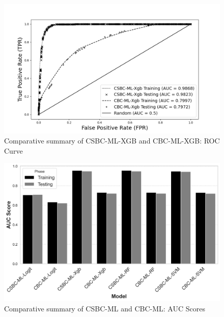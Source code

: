 \begin{figure}[h] %
	\centering
	\includegraphics[width=0.8 \textwidth]{csbc_cbc_xgb.png} %
	\caption{Comparative summary of CSBC-ML-XGB and CBC-ML-XGB: ROC Curve}
	\label{fig:model_comparison_roc} %
\end{figure}

\begin{figure}[h] %
	\centering
	\includegraphics[scale=0.6]{auc_comparisonbw.png} %
	\caption{Comparative summary of CSBC-ML and CBC-ML: AUC Scores}
	\label{fig:model_comparison_auc} %
\end{figure}

